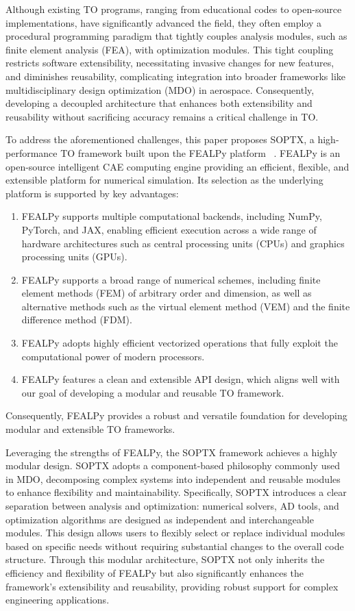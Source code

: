 \documentclass[mathpazo]{cicp}
\begin{document}
Although existing TO programs, ranging from educational codes to open-source implementations, have significantly advanced the field, they often employ a procedural programming paradigm that tightly couples analysis modules, such as finite element analysis (FEA), with optimization modules. This tight coupling restricts software extensibility, necessitating invasive changes for new features, and diminishes reusability, complicating integration into broader frameworks like multidisciplinary design optimization (MDO) in aerospace. Consequently, developing a decoupled architecture that enhances both extensibility and reusability without sacrificing accuracy remains a critical challenge in TO.

To address the aforementioned challenges, this paper proposes SOPTX, a high-performance TO framework built upon the FEALPy platform ~\cite{fealpy}. FEALPy is an open-source intelligent CAE computing engine providing an efficient, flexible, and extensible platform for numerical simulation. Its selection as the underlying platform is supported by key advantages:
\vspace{-1ex}
\begin{enumerate}
	\item FEALPy supports multiple computational backends, including NumPy, PyTorch, and JAX, enabling efficient execution across a wide range of hardware architectures such as central processing units (CPUs) and graphics processing units (GPUs).
	\item FEALPy supports a broad range of numerical schemes, including finite element methods (FEM) of arbitrary order and dimension, as well as alternative methods such as the virtual element method (VEM) and the finite difference method (FDM).
	\item FEALPy adopts highly efficient vectorized operations that fully exploit the computational power of modern processors.
	\item FEALPy features a clean and extensible API design, which aligns well with our goal of developing a modular and reusable TO framework.
\end{enumerate}
\vspace{-1ex}
Consequently, FEALPy provides a robust and versatile foundation for developing modular and extensible TO frameworks.

Leveraging the strengths of FEALPy, the SOPTX framework achieves a highly modular design. SOPTX adopts a component-based philosophy commonly used in MDO, decomposing complex systems into independent and reusable modules to enhance flexibility and maintainability. Specifically, SOPTX introduces a clear separation between analysis and optimization: numerical solvers, AD tools, and optimization algorithms are designed as independent and interchangeable modules. This design allows users to flexibly select or replace individual modules based on specific needs without requiring substantial changes to the overall code structure. Through this modular architecture, SOPTX not only inherits the efficiency and flexibility of FEALPy but also significantly enhances the framework’s extensibility and reusability, providing robust support for complex engineering applications.
\end{document}
